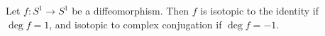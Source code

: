 Let $f: S^1 \to S^1$ be a diffeomorphism. Then $f$ is isotopic to the identity if $\deg f = 1$, and isotopic to complex conjugation if $\deg f = -1$.
